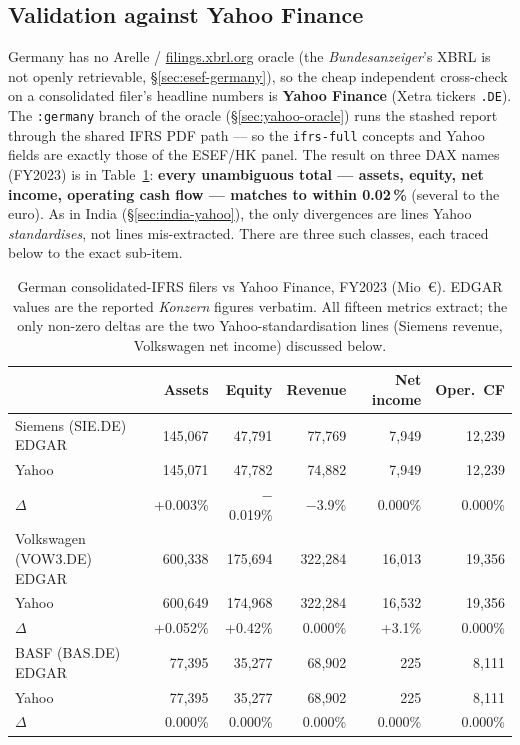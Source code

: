 \documentclass[11pt,a4paper]{report}
\begin{document}
\subsection{Validation against Yahoo Finance}\label{sec:esef-germany-yahoo}

Germany has no Arelle / \href{https://filings.xbrl.org}{filings.xbrl.org} oracle (the \emph{Bundesanzeiger}'s
XBRL is not openly retrievable, \S\ref{sec:esef-germany}), so the cheap independent cross-check on a
consolidated filer's headline numbers is \textbf{Yahoo Finance} (Xetra tickers \texttt{.DE}). The
\texttt{:germany} branch of the oracle (\S\ref{sec:yahoo-oracle}) runs the stashed report through the shared
IFRS PDF path --- so the \texttt{ifrs-full} concepts and Yahoo fields are exactly those of the ESEF/HK panel.
The result on three DAX names (FY2023) is in Table~\ref{tab:de-yahoo}: \textbf{every unambiguous total ---
assets, equity, net income, operating cash flow --- matches to within 0.02\,\%} (several to the euro). As in
India (\S\ref{sec:india-yahoo}), the only divergences are lines Yahoo \emph{standardises}, not lines
mis-extracted. There are three such classes, each traced below to the exact sub-item.

\begin{table}[h]
\centering\small
\caption{German consolidated-IFRS filers vs Yahoo Finance, FY2023 (Mio~€). EDGAR values are the reported
\emph{Konzern} figures verbatim. All fifteen metrics extract; the only non-zero deltas are the two
Yahoo-standardisation lines (Siemens revenue, Volkswagen net income) discussed below.}
\label{tab:de-yahoo}
\begin{tabular}{@{}lrrrrr@{}}
\toprule
& \textbf{Assets} & \textbf{Equity} & \textbf{Revenue} & \textbf{Net income} & \textbf{Oper.\ CF} \\
\midrule
Siemens (SIE.DE) EDGAR    & 145{,}067 & 47{,}791 & 77{,}769 & 7{,}949  & 12{,}239 \\
\quad Yahoo               & 145{,}071 & 47{,}782 & 74{,}882 & 7{,}949  & 12{,}239 \\
\quad $\Delta$            & +0.003\%  & $-$0.019\% & $-$3.9\% & 0.000\% & 0.000\% \\[2pt]
Volkswagen (VOW3.DE) EDGAR & 600{,}338 & 175{,}694 & 322{,}284 & 16{,}013 & 19{,}356 \\
\quad Yahoo               & 600{,}649 & 174{,}968 & 322{,}284 & 16{,}532 & 19{,}356 \\
\quad $\Delta$            & +0.052\%  & +0.42\% & 0.000\% & +3.1\% & 0.000\% \\[2pt]
BASF (BAS.DE) EDGAR       & 77{,}395 & 35{,}277 & 68{,}902 & 225 & 8{,}111 \\
\quad Yahoo               & 77{,}395 & 35{,}277 & 68{,}902 & 225 & 8{,}111 \\
\quad $\Delta$            & 0.000\% & 0.000\% & 0.000\% & 0.000\% & 0.000\% \\
\bottomrule
\end{tabular}
\end{table}
\end{document}
